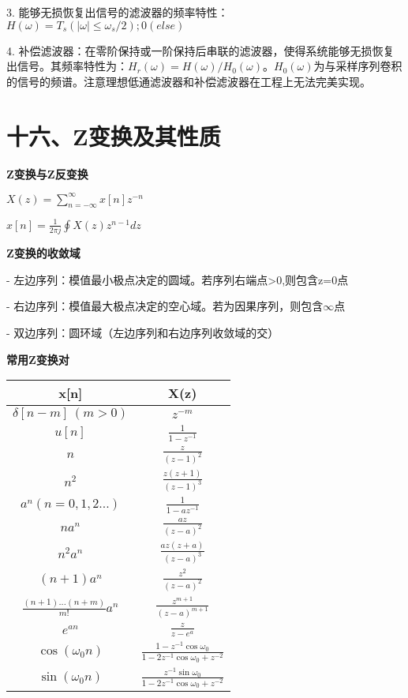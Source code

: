 3. 能够无损恢复出信号的滤波器的频率特性：$H(\omega)=T_s(|\omega|\leq\omega_s/2);0(else)$

4. 补偿滤波器：在零阶保持或一阶保持后串联的滤波器，使得系统能够无损恢复出信号。其频率特性为：$H_r(\omega)=H(\omega)/H_0(\omega)$。$H_0(\omega)$为与采样序列卷积的信号的频谱。注意理想低通滤波器和补偿滤波器在工程上无法完美实现。

\section*{十六、Z变换及其性质}

\textbf{Z变换与Z反变换}

$X(z)= \sum\limits_{n=-\infty}^{\infty}x[n]z^{-n}$

$x[n]= \frac{1}{2\pi j}\oint X(z)z^{n-1}dz$

\textbf{Z变换的收敛域}

- 左边序列：模值最小极点决定的圆域。若序列右端点>0,则包含z=0点

- 右边序列：模值最大极点决定的空心域。若为因果序列，则包含$\infty$点

- 双边序列：圆环域（左边序列和右边序列收敛域的交）

\textbf{常用Z变换对}

\begin{tabular}{c|c}
x[n] & X(z) \\
\hline
$\delta\left[n-m\right]\ \left(m>0\right)$ & $z^{-m} $ \\
$ u[n]$ & $\frac{1}{1-z^{-1}}$ \\
$ n $ & $\frac{z}{(z-1)^{2}}$ \\
$ n^{2} $ & $\frac{z(z+1)}{(z-1)^{3}}$ \\
$ a^{n}(n=0,1,2...) $ & $\frac{1}{1-az^{-1}}$ \\
$ na^{n} $ & $\frac{az}{(z-a)^{2}}$ \\
$ n^{2}a^{n} $ & $\frac{az(z+a)}{(z-a)^{3}}$ \\
$(n+1)a^{n} $ & $\frac{z^2}{(z-a)^{2}}$ \\
$\frac{(n+1)...(n+m)}{m!}a^{n} $ & $\frac{z^{m+1}}{(z-a)^{m+1}}$ \\
$e^{an} $ & $\frac{z}{z-e^{a}}$ \\
$ \cos(\omega_{0}n)$ & $ \frac{1-z^{-1}\cos\omega_{0}}{1-2z^{-1}\cos\omega_{0}+z^{-2}}$ \\
$ \sin(\omega_{0}n) $ & $\frac{z^{-1}\sin\omega_{0}}{1-2z^{-1}\cos\omega_{0}+z^{-2}}$ \\
\end{tabular}

